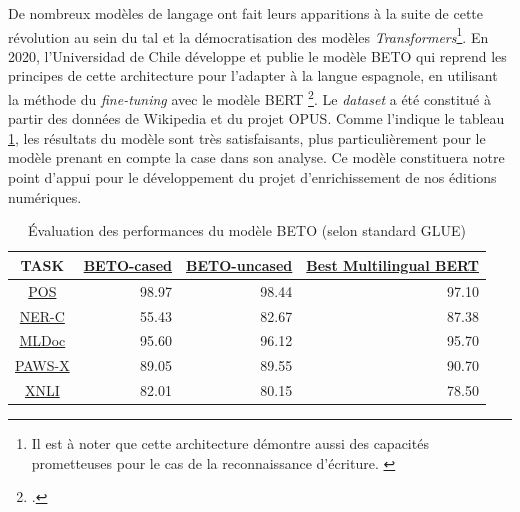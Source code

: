 	De nombreux modèles de langage ont fait leurs apparitions à la suite de cette révolution au sein du \gls{tal} et la démocratisation des modèles \textit{Transformers}\footnote{Il est à noter que cette architecture démontre aussi des capacités prometteuses pour le cas de la reconnaissance d'écriture. \cite{kassAttentionHTRHandwrittenText2022}}. En 2020, l'Universidad de Chile développe et publie le modèle BETO qui reprend les principes de cette architecture pour l'adapter à la langue espagnole, en utilisant la méthode du \textit{fine-tuning} avec le modèle BERT \footcite{caneteSpanishPreTrainedBERT2020}. Le \textit{dataset} a été constitué à partir des données de Wikipedia et du projet OPUS. Comme l'indique le tableau \ref{tab:beto_benchmarlk}, les résultats du modèle sont très satisfaisants, plus particulièrement pour le modèle prenant en compte la case dans son analyse. Ce modèle constituera notre point d'appui pour le développement du projet d'enrichissement de nos éditions numériques.
	
    \begin{table}[]
    \begin{tabular}{|c|r|r|r|}
    \hline
    \textbf{TASK} & \multicolumn{1}{c|}{\href{https://huggingface.co/dccuchile/bert-base-spanish-wwm-cased}{\textbf{BETO-cased}}} & \multicolumn{1}{c|}{\href{https://huggingface.co/dccuchile/bert-base-spanish-wwm-uncased}{\textbf{BETO-uncased}}} & \multicolumn{1}{c|}{\href{https://huggingface.co/bert-base-uncased}{\textbf{Best Multilingual BERT}}} \\ \hline
    \href{https://lindat.mff.cuni.cz/repository/xmlui/handle/11234/1-1827}{POS}           & 98.97                                    & 98.44                                      & 97.10                                                \\ \cline{1-1}
    \href{https://www.kaggle.com/datasets/nltkdata/conll-corpora}{NER-C}         & 55.43                                    & 82.67                                      & 87.38                                                \\ \cline{1-1}
    \href{https://github.com/facebookresearch/MLDoc}{MLDoc}         & 95.60                                    & 96.12                                      & 95.70                                                \\ \cline{1-1}
    \href{https://github.com/google-research-datasets/paws/tree/master/pawsx}{PAWS-X}        & 89.05                                    & 89.55                                      & 90.70                                                \\ \cline{1-1}
    \href{https://github.com/facebookresearch/XNLI}{XNLI}          & 82.01                                    & 80.15                                      & 78.50                                                \\ \cline{1-1} \hline
    \end{tabular}
    \caption{Évaluation des performances du modèle BETO (selon standard GLUE)}
    \label{tab:beto_benchmarlk}
    \end{table}
	
